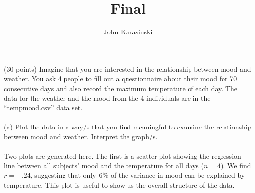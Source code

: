 \documentclass[onecolumn,10pt]{jhwhw}
\author{John Karasinski}
\title{Final}
\begin{document}

\problem{}
(30 points) Imagine that you are interested in the relationship between mood and weather. You ask 4 people to fill out a questionnaire about their mood for 70 consecutive days and also record the maximum temperature of each day. The data for the weather and the mood from the 4 individuals are in the “tempmood.csv” data set.\\
\\
(a) Plot the data in a way/s that you find meaningful to examine the relationship between mood and weather. Interpret the graph/s.\\
\\
Two plots are generated here. The first is a scatter plot showing the regression line between all subjects' mood and the temperature for all days ($n=4$). We find $r=-.24$, suggesting that only~6\% of the variance in mood can be explained by temperature. This plot is useful to show us the overall structure of the data.
\end{document}

